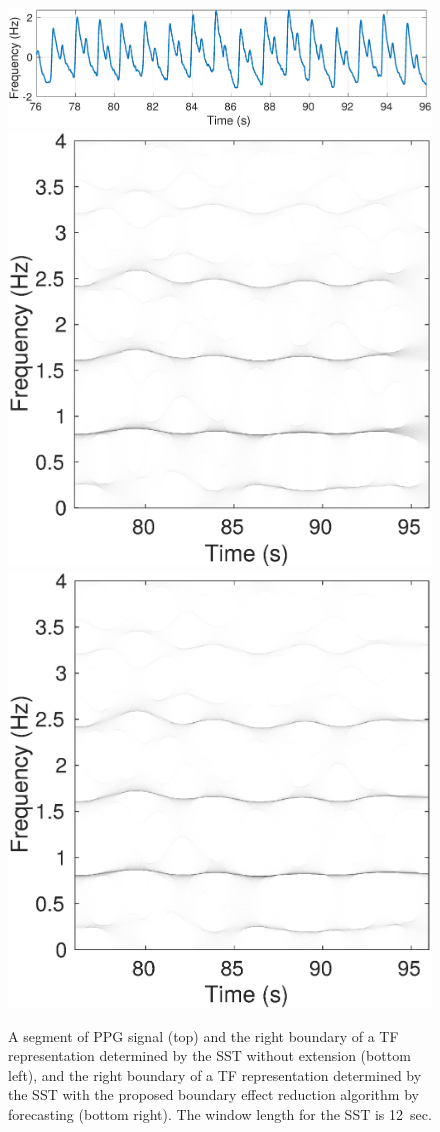 \documentclass[journal]{IEEEtran}
\begin{document}
\begin{figure}
\centering
\includegraphics[width=.48\textwidth]{PPGsig.eps}
\includegraphics[width=.24\textwidth]{zoomSSTintro.eps}
\includegraphics[width=.24\textwidth]{zoomSSTBoundEffRed.eps}
\caption{A segment of PPG signal (top) and the right boundary of a TF representation determined by the SST without extension (bottom left), and the right boundary of a TF representation determined by the SST with the proposed boundary effect reduction algorithm by forecasting (bottom right). The window length for the SST is 12~sec.}
\label{fig:ex.intro}
\end{figure}
\end{document}
